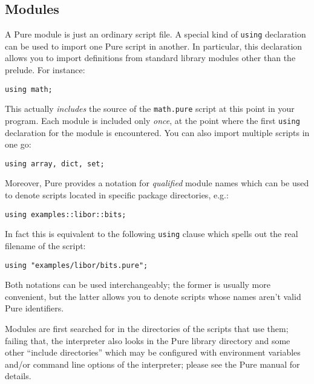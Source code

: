 \documentclass[a4paper,12pt]{article}
\begin{document}
\subsection{Modules}

A Pure module is just an ordinary script file. A special kind of \lstinline{using} declaration can be used to import one Pure script in another. In particular, this declaration allows you to import definitions from standard library modules other than the prelude. For instance:

\begin{lstlisting}
using math;
\end{lstlisting}

This actually \emph{includes} the source of the \texttt{math.pure} script at this point in your program. Each module is included only \emph{once}, at the point where the first \lstinline{using} declaration for the module is encountered. You can also import multiple scripts in one go:

\begin{lstlisting}
using array, dict, set;
\end{lstlisting}

Moreover, Pure provides a notation for \emph{qualified} module names which can be used to denote scripts located in specific package directories, e.g.:

\begin{lstlisting}
using examples::libor::bits;
\end{lstlisting}

In fact this is equivalent to the following \lstinline|using| clause which spells out the real filename of the script:

\begin{lstlisting}
using "examples/libor/bits.pure";
\end{lstlisting}

Both notations can be used interchangeably; the former is usually more convenient, but the latter allows you to denote scripts whose names aren't valid Pure identifiers.

Modules are first searched for in the directories of the scripts that use them; failing that, the interpreter also looks in the Pure library directory and some other ``include directories'' which may be configured with environment variables and/or command line options of the interpreter; please see the Pure manual for details.
\end{document}
